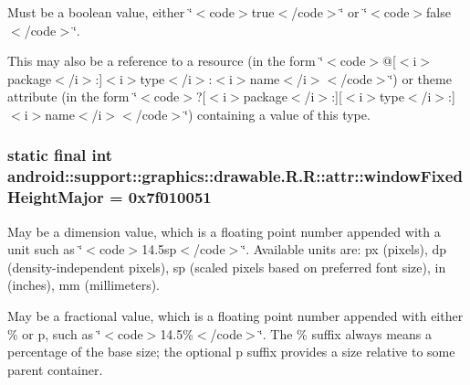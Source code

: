 Must be a boolean value, either \char`\"{}$<$code$>$true$<$/code$>$\char`\"{} or \char`\"{}$<$code$>$false$<$/code$>$\char`\"{}. 

This may also be a reference to a resource (in the form \char`\"{}$<$code$>$@\mbox{[}$<$i$>$package$<$/i$>$:\mbox{]}$<$i$>$type$<$/i$>$:$<$i$>$name$<$/i$>$$<$/code$>$\char`\"{}) or theme attribute (in the form \char`\"{}$<$code$>$?\mbox{[}$<$i$>$package$<$/i$>$:\mbox{]}\mbox{[}$<$i$>$type$<$/i$>$:\mbox{]}$<$i$>$name$<$/i$>$$<$/code$>$\char`\"{}) containing a value of this type. \hypertarget{classandroid_1_1support_1_1graphics_1_1drawable_1_1_r_1_1attr_4fa1e3901c4b2a78582aee6722780f44}{
\subsubsection[{windowFixedHeightMajor}]{\setlength{\rightskip}{0pt plus 5cm}static final int android::support::graphics::drawable.R.R::attr::windowFixedHeightMajor = 0x7f010051}}
\label{classandroid_1_1support_1_1graphics_1_1drawable_1_1_r_1_1attr_4fa1e3901c4b2a78582aee6722780f44}


May be a dimension value, which is a floating point number appended with a unit such as \char`\"{}$<$code$>$14.5sp$<$/code$>$\char`\"{}. Available units are: px (pixels), dp (density-independent pixels), sp (scaled pixels based on preferred font size), in (inches), mm (millimeters). 

May be a fractional value, which is a floating point number appended with either \% or p, such as \char`\"{}$<$code$>$14.5\%$<$/code$>$\char`\"{}. The \% suffix always means a percentage of the base size; the optional p suffix provides a size relative to some parent container. 

